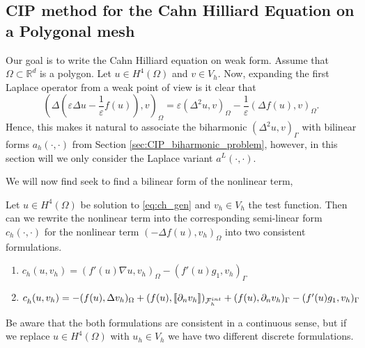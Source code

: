 \subsection{ CIP method for the Cahn Hilliard Equation on a Polygonal mesh}%
\label{sub:writing_the_cahn_hilliard_equation_of_weak_form}

Our goal is to write the Cahn Hilliard equation on weak form.
Assume that $\Omega  \subset \mathbb{R} ^{d}$ is a polygon.
 Let $u \in  H^{4}( \Omega ) $ and $v \in V_{h} $.
Now, expanding the first Laplace operator from a weak point of view is it clear that
\[
 ( \Delta ( \varepsilon  \Delta u - \frac{1}{\varepsilon } f( u) ) ,v )_{\Omega } = \varepsilon ( \Delta^{2} u ,v )_{\Omega } - \frac{1}{\varepsilon } ( \Delta f( u)  ,v )_{\Omega }.
\]
Hence, this makes it natural to associate the biharmonic $( \Delta ^2 u,v)_{\Gamma } $ with bilinear forms $a_{h}( \cdot ,\cdot ) $ from Section \ref{sec:CIP_biharmonic_problem}, however, in this section will we only consider the Laplace
variant $a^{L}( \cdot ,\cdot ) $.

We will now find seek to find a bilinear form of the nonlinear term,
\begin{lemma}
    Let $u \in H^4( \Omega ) $ be solution to \eqref{eq:ch_gen} and $v_{h} \in V_{h}$ the test function.
Then can we rewrite the nonlinear term into the corresponding semi-linear form $c_{h}( \cdot ,\cdot )  $ for the nonlinear term $( -\Delta f( u) , v_{h})_{\Omega }$ into two consistent formulations.
\begin{enumerate}[label=\arabic*)]
    \item  $c^{}_{h} ( u,v_{h})  = ( f' ( u) \nabla u, v_{h} )_{\Omega }  - ( f'( u)  g_{1}   ,  v_{h})_{\Gamma }$
    \item
        $c^{}_{h} ( u,v_{h})  = -( f( u), \Delta v_{h} )_{\Omega }+  ( f( u) , \left[\!\left[  \partial _{n}v_{h}  \right]\!\right]  )_{\mathcal{F} _{h}^{int}} + ( f(u), \partial _{n} v_{h})_{\Gamma  }  - ( f'( u)  g_{1}   ,  v_{h})_{\Gamma }$
\end{enumerate}
\begin{remark}
    Be aware that the both formulations are consistent in a continuous sense, but if we replace $u \in H^{4}( \Omega ) $ with  $u_{h} \in  V_{h}$ we have two different discrete formulations.
\end{remark}

\end{lemma}

